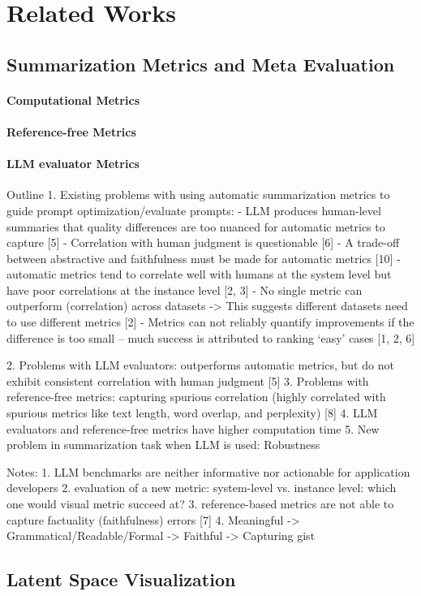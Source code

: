 \section{Related Works}
\subsection{Summarization Metrics and Meta Evaluation}
\paragraph{Computational Metrics}
\paragraph{Reference-free Metrics}
\paragraph{LLM evaluator Metrics}

Outline
1. Existing problems with using automatic summarization metrics to guide prompt optimization/evaluate prompts:
    - LLM produces human-level summaries that quality differences are too nuanced for automatic metrics to capture [5]
    - Correlation with human judgment is questionable [6]
    - A trade-off between abstractive and faithfulness must be made for automatic metrics [10]
    - automatic metrics tend to correlate well with humans at the system level but have poor correlations at the instance level [2, 3]
    - No single metric can outperform (correlation) across datasets -> This suggests different datasets need to use different metrics [2]
    - Metrics can not reliably quantify improvements if the difference is too small -- much success is attributed to ranking `easy' cases [1, 2, 6]

2. Problems with LLM evaluators: outperforms automatic metrics, but do not exhibit consistent correlation with human judgment [5]
3. Problems with reference-free metrics: capturing spurious correlation (highly correlated with spurious metrics like text length, word overlap, and perplexity) [8]
4. LLM evaluators and reference-free metrics have higher computation time
5. New problem in summarization task when LLM is used: Robustness

Notes:
    1. LLM benchmarks are neither informative nor actionable for application developers
    2. evaluation of a new metric: system-level vs. instance level: which one would visual metric succeed at?
    3. reference-based metrics are not able to capture factuality (faithfulness) errors [7]
    4. Meaningful -> Grammatical/Readable/Formal -> Faithful -> Capturing gist


\subsection{Latent Space Visualization}